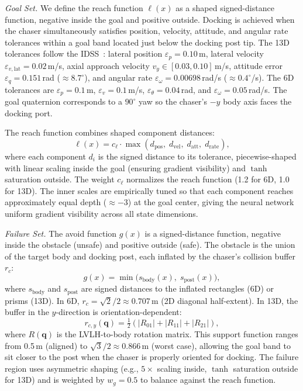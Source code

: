 \documentclass[letterpaper, 10 pt, conference]{ieeeconf}
\begin{document}
\textit{Goal Set.}
We define the reach function $\ell(x)$ as a shaped signed-distance function, negative inside the goal and positive outside. Docking is achieved when the chaser simultaneously satisfies position, velocity, attitude, and angular rate tolerances within a goal band located just below the docking post tip. The 13D tolerances follow the IDSS~\cite{nasaidss}: lateral position $\varepsilon_p = 0.10$\,m, lateral velocity $\varepsilon_{v,\mathrm{lat}} = 0.02$\,m/s, axial approach velocity $v_y \in [0.03, 0.10]$\,m/s, attitude error $\varepsilon_q = 0.151$\,rad ($\approx 8.7^\circ$), and angular rate $\varepsilon_\omega = 0.00698$\,rad/s ($\approx 0.4^\circ$/s). The 6D tolerances are $\varepsilon_p = 0.1$\,m, $\varepsilon_v = 0.1$\,m/s, $\varepsilon_\theta = 0.04$\,rad, and $\varepsilon_\omega = 0.05$\,rad/s. The goal quaternion corresponds to a $90^\circ$ yaw so the chaser's $-y$ body axis faces the docking port.

The reach function combines shaped component distances:
\begin{equation}\label{eq:reach_fn}
\ell(x) = c_\ell \cdot \max(d_{\mathrm{pos}},\; d_{\mathrm{vel}},\; d_{\mathrm{att}},\; d_{\mathrm{rate}}),
\end{equation}
where each component $d_i$ is the signed distance to its tolerance, piecewise-shaped with linear scaling inside the goal (ensuring gradient visibility) and $\tanh$ saturation outside. The weight $c_\ell$ normalizes the reach function (1.2 for 6D, 1.0 for 13D). The inner scales are empirically tuned so that each component reaches approximately equal depth ($\approx -3$) at the goal center, giving the neural network uniform gradient visibility across all state dimensions.

\textit{Failure Set.}
The avoid function $g(x)$ is a signed-distance function, negative inside the obstacle (unsafe) and positive outside (safe). The obstacle is the union of the target body and docking post, each inflated by the chaser's collision buffer $r_c$:
\begin{equation}\label{eq:avoid_fn}
g(x) = \min\!\big(s_{\mathrm{body}}(x),\; s_{\mathrm{post}}(x)\big),
\end{equation}
where $s_{\mathrm{body}}$ and $s_{\mathrm{post}}$ are signed distances to the inflated rectangles (6D) or prisms (13D). In 6D, $r_c = \sqrt{2}/2 \approx 0.707$\,m (2D diagonal half-extent). In 13D, the buffer in the $y$-direction is orientation-dependent:
\begin{equation}\label{eq:cb_y}
r_{c,y}(\mathbf{q}) = \tfrac{1}{2}(|R_{01}| + |R_{11}| + |R_{21}|),
\end{equation}
where $R(\mathbf{q})$ is the LVLH-to-body rotation matrix. This support function ranges from 0.5\,m (aligned) to $\sqrt{3}/2 \approx 0.866$\,m (worst case), allowing the goal band to sit closer to the post when the chaser is properly oriented for docking. The failure region uses asymmetric shaping (e.g., $5\times$ scaling inside, $\tanh$ saturation outside for 13D) and is weighted by $w_g = 0.5$ to balance against the reach function.
\end{document}
